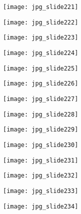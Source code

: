 \documentclass[main.tex]{subfiles}
\begin{document}
\begin{center}
\texttt{[image: jpg\_slide221]}
\end{center}

\begin{center}
\texttt{[image: jpg\_slide222]}
\end{center}

\begin{center}
\texttt{[image: jpg\_slide223]}
\end{center}

\begin{center}
\texttt{[image: jpg\_slide224]}
\end{center}

\begin{center}
\texttt{[image: jpg\_slide225]}
\end{center}

\begin{center}
\texttt{[image: jpg\_slide226]}
\end{center}

\begin{center}
\texttt{[image: jpg\_slide227]}
\end{center}

\begin{center}
\texttt{[image: jpg\_slide228]}
\end{center}

\begin{center}
\texttt{[image: jpg\_slide229]}
\end{center}

\begin{center}
\texttt{[image: jpg\_slide230]}
\end{center}

\begin{center}
\texttt{[image: jpg\_slide231]}
\end{center}

\begin{center}
\texttt{[image: jpg\_slide232]}
\end{center}

\begin{center}
\texttt{[image: jpg\_slide233]}
\end{center}

\begin{center}
\texttt{[image: jpg\_slide234]}
\end{center}
\end{document}
